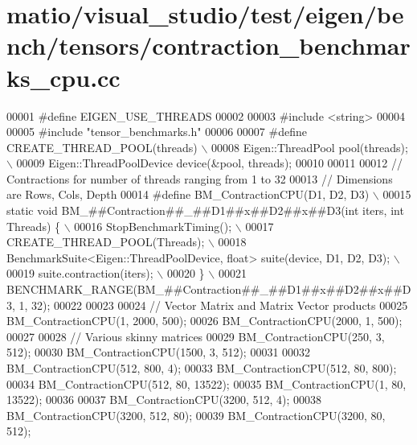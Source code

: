 \hypertarget{matio_2visual__studio_2test_2eigen_2bench_2tensors_2contraction__benchmarks__cpu_8cc_source}{}\section{matio/visual\+\_\+studio/test/eigen/bench/tensors/contraction\+\_\+benchmarks\+\_\+cpu.cc}
\label{matio_2visual__studio_2test_2eigen_2bench_2tensors_2contraction__benchmarks__cpu_8cc_source}

\begin{DoxyCode}
00001 \textcolor{preprocessor}{#define EIGEN\_USE\_THREADS}
00002 
00003 \textcolor{preprocessor}{#include <string>}
00004 
00005 \textcolor{preprocessor}{#include "tensor\_benchmarks.h"}
00006 
00007 \textcolor{preprocessor}{#define CREATE\_THREAD\_POOL(threads)             \(\backslash\)}
00008 \textcolor{preprocessor}{Eigen::ThreadPool pool(threads);                \(\backslash\)}
00009 \textcolor{preprocessor}{Eigen::ThreadPoolDevice device(&pool, threads);}
00010 
00011 
00012 \textcolor{comment}{// Contractions for number of threads ranging from 1 to 32}
00013 \textcolor{comment}{// Dimensions are Rows, Cols, Depth}
00014 \textcolor{preprocessor}{#define BM\_ContractionCPU(D1, D2, D3)                                         \(\backslash\)}
00015 \textcolor{preprocessor}{  static void BM\_##Contraction##\_##D1##x##D2##x##D3(int iters, int Threads) \{ \(\backslash\)}
00016 \textcolor{preprocessor}{    StopBenchmarkTiming();                                                    \(\backslash\)}
00017 \textcolor{preprocessor}{    CREATE\_THREAD\_POOL(Threads);                                              \(\backslash\)}
00018 \textcolor{preprocessor}{    BenchmarkSuite<Eigen::ThreadPoolDevice, float> suite(device, D1, D2, D3); \(\backslash\)}
00019 \textcolor{preprocessor}{    suite.contraction(iters);                                                 \(\backslash\)}
00020 \textcolor{preprocessor}{  \}                                                                           \(\backslash\)}
00021 \textcolor{preprocessor}{  BENCHMARK\_RANGE(BM\_##Contraction##\_##D1##x##D2##x##D3, 1, 32);}
00022 
00023 
00024 \textcolor{comment}{// Vector Matrix and Matrix Vector products}
00025 BM\_ContractionCPU(1, 2000, 500);
00026 BM\_ContractionCPU(2000, 1, 500);
00027 
00028 \textcolor{comment}{// Various skinny matrices}
00029 BM\_ContractionCPU(250, 3, 512);
00030 BM\_ContractionCPU(1500, 3, 512);
00031 
00032 BM\_ContractionCPU(512, 800, 4);
00033 BM\_ContractionCPU(512, 80, 800);
00034 BM\_ContractionCPU(512, 80, 13522);
00035 BM\_ContractionCPU(1, 80, 13522);
00036 
00037 BM\_ContractionCPU(3200, 512, 4);
00038 BM\_ContractionCPU(3200, 512, 80);
00039 BM\_ContractionCPU(3200, 80, 512);
\end{DoxyCode}
